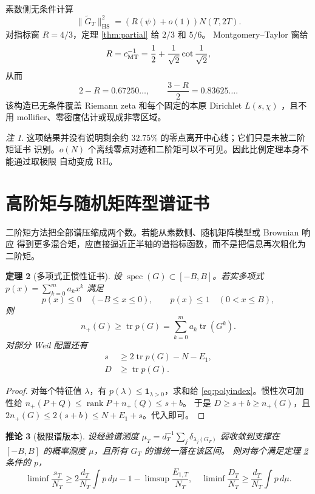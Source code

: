 \documentclass[UTF8,11pt,a4paper]{ctexart}
\newtheorem{theorem}{定理}[section]
\newtheorem{corollary}[theorem]{推论}
\theoremstyle{definition}
\theoremstyle{remark}
\newtheorem{remark}[theorem]{注}
\newcommand{\tr}{\operatorname{tr}}
\newcommand{\rank}{\operatorname{rank}}
\newcommand{\HS}{\mathrm{HS}}
\newcommand{\spec}{\operatorname{spec}}
\begin{document}
素数侧无条件计算
\[
 \|\widetilde G_T\|_{\HS}^2=(R(\psi)+o(1))N(T,2T).
\]
对指标窗 $R=4/3$，定理 \ref{thm:partial} 给 $2/3$ 和 $5/6$。
Montgomery--Taylor 窗给
\[
 R=c_{\rm MT}^{-1}
 =\frac12+\frac1{\sqrt2}\cot\frac1{\sqrt2},
\]
从而
\[
 2-R=0.67250\ldots,\qquad
 \frac{3-R}{2}=0.83625\ldots.
\]
该构造已无条件覆盖 Riemann zeta 和每个固定的本原 Dirichlet
$L(s,\chi)$ \cite{AF26}，且不用 mollifier、零密度估计或现成非零区域。

\begin{remark}
这项结果并没有说明剩余约 $32.75\%$ 的零点离开中心线；它们只是未被二阶矩证书
识别。$o(N)$ 个离线零点对迹和二阶矩可以不可见。因此比例定理本身不能通过取极限
自动变成 RH。
\end{remark}

\section{高阶矩与随机矩阵型谱证书}

二阶矩方法把全部谱压缩成两个数。若能从素数侧、随机矩阵模型或 Brownian 响应
得到更多混合矩，应直接逼近正半轴的谱指标函数，而不是把信息再次粗化为二阶矩。

\begin{theorem}[多项式正惯性证书]\label{thm:poly}
设 $\spec(G)\subset[-B,B]$。若实多项式
$p(x)=\sum_{k=0}^m a_kx^k$ 满足
\[
 p(x)\le0\quad(-B\le x\le0),\qquad
 p(x)\le1\quad(0<x\le B),
\]
则
\begin{equation}\label{eq:polyindex}
 n_+(G)\ge\tr p(G)=\sum_{k=0}^m a_k\tr(G^k).
\end{equation}
对部分 Weil 配置还有
\begin{align}
 s&\ge2\tr p(G)-N-E_1, \label{eq:polys}\\
 D&\ge\tr p(G). \label{eq:polyd}
\end{align}
\end{theorem}

\begin{proof}
对每个特征值 $\lambda$，有 $p(\lambda)\le\mathbf1_{\lambda>0}$，求和给
\eqref{eq:polyindex}。惯性次可加性给
$n_+(P+Q)\le\rank P+n_+(Q)\le s+b$。
于是 $D\ge s+b\ge n_+(G)$，且
$2n_+(G)\le2(s+b)\le N+E_1+s$。代入即可。
\end{proof}

\begin{corollary}[极限谱版本]
设经验谱测度 $\mu_T=d_T^{-1}\sum_j\delta_{\lambda_j(G_T)}$
弱收敛到支撑在 $[-B,B]$ 的概率测度 $\mu$，且所有 $G_T$ 的谱统一落在该区间。
则对每个满足定理 \ref{thm:poly} 条件的 $p$，
\[
 \liminf\frac{s_T}{N_T}
 \ge2\frac{d_T}{N_T}\int p\,d\mu-1-\limsup\frac{E_{1,T}}{N_T},
\quad
 \liminf\frac{D_T}{N_T}\ge\frac{d_T}{N_T}\int p\,d\mu.
\]
\end{corollary}
\end{document}
